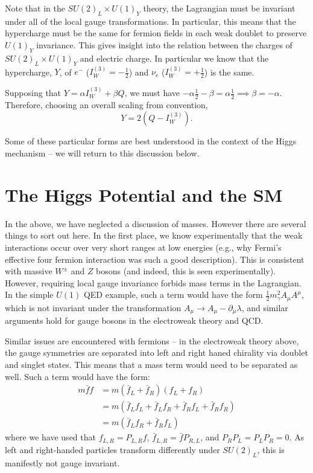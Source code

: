 Note that in the $SU(2)_L \times U(1)_{Y}$ theory, the Lagrangian must be invariant under all of the 
local gauge transformations. In particular, this means that the hypercharge must be the same for 
fermion fields in each weak doublet to preserve $U(1)_{Y}$ invariance. This gives insight 
into the relation between the charges of $SU(2)_L \times U(1)_{Y}$ and electric charge. In particular
we know that the hypercharge, $Y$, of $e^{-}$ ($I_W^{(3)} = -\frac{1}{2}$) and $\nu_{e}$ 
($I_W^{(3)} = +\frac{1}{2}$) is the same. 

Supposing that $Y=\alpha I_{W}^{(3)} + \beta Q$, we must have
$-\alpha \frac{1}{2} - \beta = \alpha \frac{1}{2} \implies \beta = -\alpha$. Therefore, choosing 
an overall scaling from convention,
\begin{equation}
Y = 2(Q-I_{W}^{(3)}).
\end{equation}

Some of these particular forms are best understood in the context of the Higgs mechanism -- we will return to 
this discussion below.


\section{The Higgs Potential and the SM}
In the above, we have neglected a discussion of masses. However there are several things to sort out here.
In the first place, we know experimentally that the weak interactions occur over very short ranges at low 
energies (e.g., why Fermi's effective four fermion interaction was such a good description). This is consistent
with massive $W^{\pm}$ and $Z$ bosons (and indeed, this is seen experimentally). However, requiring local 
gauge invariance forbids mass terms in the Lagrangian. In the simple $U(1)$ QED example, such a term would have 
the form $\frac{1}{2}m_{\gamma}^2A_{\mu}A^{\mu}$, which is not invariant under the transformation $A_{\mu}\rightarrow A_{\mu}-\partial_{\mu}\lambda$, and similar arguments hold for gauge bosons in the electroweak theory and QCD.

Similar issues are encountered with fermions -- in the electroweak theory above, the gauge symmetries are 
separated into left and right haned chirality via doublet and singlet states. This means that a mass term 
would need to be separated as well. Such a term would have the form:
\begin{align}
m\bar{f}f &= m(\bar{f}_L+\bar{f}_R)(f_L+f_R)\\
&=m(\bar{f}_Lf_{L}+\bar{f}_{L}f_{R}+\bar{f}_{R}f_{L} + \bar{f}_{R}f_{R})\\
&=m(\bar{f}_{L}f_{R}+\bar{f}_{R}f_{L})
\end{align}
where we have used that $f_{L, R} = P_{L,R}f$, $\bar{f}_{L,R} = \bar{f}P_{R,L}$, and $P_{R}P_{L} = P_{L}P_{R} = 0$.
As left and right-handed particles transform differently under $SU(2)_{L}$, this is manifestly not gauge invariant.

